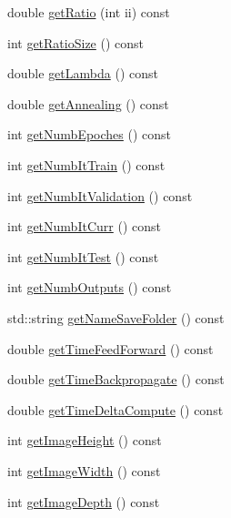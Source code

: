 \begin{DoxyCompactItemize}
\item 
double \hyperlink{classTrainingAlgorithm_afa922b894aeaf819cf8bb1155d6233c8}{get\+Ratio} (int ii) const 
\item 
int \hyperlink{classTrainingAlgorithm_ae91e4d6bd3c208e747e51c06b1edcad2}{get\+Ratio\+Size} () const 
\item 
double \hyperlink{classTrainingAlgorithm_a830cc287f64f100a75d60bc7a77b2691}{get\+Lambda} () const 
\item 
double \hyperlink{classTrainingAlgorithm_a0a915038dcec14278377768cab608e00}{get\+Annealing} () const 
\item 
int \hyperlink{classTrainingAlgorithm_ab6e1844ff62e71e1f2e1d6b853984ef0}{get\+Numb\+Epoches} () const 
\item 
int \hyperlink{classTrainingAlgorithm_acdac819358acaf6233b10e16d490917f}{get\+Numb\+It\+Train} () const 
\item 
int \hyperlink{classTrainingAlgorithm_a9fb4f8755f0801dd2101a58fd1412c09}{get\+Numb\+It\+Validation} () const 
\item 
int \hyperlink{classTrainingAlgorithm_a45da51f783c766bb412d15d78b3596d5}{get\+Numb\+It\+Curr} () const 
\item 
int \hyperlink{classTrainingAlgorithm_afa82bedc9f44a37c60d17e1da4f47211}{get\+Numb\+It\+Test} () const 
\item 
int \hyperlink{classTrainingAlgorithm_af19cd7f9c42cdaf0ba45c864b89599e0}{get\+Numb\+Outputs} () const 
\item 
std\+::string \hyperlink{classTrainingAlgorithm_a56bdf74071286a3c9838071c71ec5593}{get\+Name\+Save\+Folder} () const 
\item 
double \hyperlink{classTrainingAlgorithm_a0fb07c2b4f2ef9b8a3c0976cea94ed48}{get\+Time\+Feed\+Forward} () const 
\item 
double \hyperlink{classTrainingAlgorithm_ac5401b7de0c1abdafe733168b68fdb54}{get\+Time\+Backpropagate} () const 
\item 
double \hyperlink{classTrainingAlgorithm_a2321a9441a33ec5122e78f052b045e09}{get\+Time\+Delta\+Compute} () const 
\item 
int \hyperlink{classTrainingAlgorithm_a6c961411d7b333b1ba94463188bd2cd9}{get\+Image\+Height} () const 
\item 
int \hyperlink{classTrainingAlgorithm_ac47fae920f286efb15e743e1b2a3d6f3}{get\+Image\+Width} () const 
\item 
int \hyperlink{classTrainingAlgorithm_a7b47be7181071d9336677faea47922ac}{get\+Image\+Depth} () const 
\end{DoxyCompactItemize}
